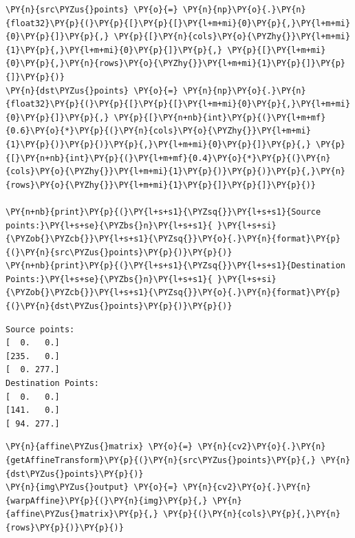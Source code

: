 \begin{tcolorbox}[breakable, size=fbox, boxrule=1pt, pad at break*=1mm,colback=cellbackground, colframe=cellborder]
	\begin{Verbatim}[commandchars=\\\{\}]
\PY{n}{src\PYZus{}points} \PY{o}{=} \PY{n}{np}\PY{o}{.}\PY{n}{float32}\PY{p}{(}\PY{p}{[}\PY{p}{[}\PY{l+m+mi}{0}\PY{p}{,}\PY{l+m+mi}{0}\PY{p}{]}\PY{p}{,} \PY{p}{[}\PY{n}{cols}\PY{o}{\PYZhy{}}\PY{l+m+mi}{1}\PY{p}{,}\PY{l+m+mi}{0}\PY{p}{]}\PY{p}{,} \PY{p}{[}\PY{l+m+mi}{0}\PY{p}{,}\PY{n}{rows}\PY{o}{\PYZhy{}}\PY{l+m+mi}{1}\PY{p}{]}\PY{p}{]}\PY{p}{)}
\PY{n}{dst\PYZus{}points} \PY{o}{=} \PY{n}{np}\PY{o}{.}\PY{n}{float32}\PY{p}{(}\PY{p}{[}\PY{p}{[}\PY{l+m+mi}{0}\PY{p}{,}\PY{l+m+mi}{0}\PY{p}{]}\PY{p}{,} \PY{p}{[}\PY{n+nb}{int}\PY{p}{(}\PY{l+m+mf}{0.6}\PY{o}{*}\PY{p}{(}\PY{n}{cols}\PY{o}{\PYZhy{}}\PY{l+m+mi}{1}\PY{p}{)}\PY{p}{)}\PY{p}{,}\PY{l+m+mi}{0}\PY{p}{]}\PY{p}{,} \PY{p}{[}\PY{n+nb}{int}\PY{p}{(}\PY{l+m+mf}{0.4}\PY{o}{*}\PY{p}{(}\PY{n}{cols}\PY{o}{\PYZhy{}}\PY{l+m+mi}{1}\PY{p}{)}\PY{p}{)}\PY{p}{,}\PY{n}{rows}\PY{o}{\PYZhy{}}\PY{l+m+mi}{1}\PY{p}{]}\PY{p}{]}\PY{p}{)}
		
\PY{n+nb}{print}\PY{p}{(}\PY{l+s+s1}{\PYZsq{}}\PY{l+s+s1}{Source points:}\PY{l+s+se}{\PYZbs{}n}\PY{l+s+s1}{ }\PY{l+s+si}{\PYZob{}\PYZcb{}}\PY{l+s+s1}{\PYZsq{}}\PY{o}{.}\PY{n}{format}\PY{p}{(}\PY{n}{src\PYZus{}points}\PY{p}{)}\PY{p}{)}
\PY{n+nb}{print}\PY{p}{(}\PY{l+s+s1}{\PYZsq{}}\PY{l+s+s1}{Destination Points:}\PY{l+s+se}{\PYZbs{}n}\PY{l+s+s1}{ }\PY{l+s+si}{\PYZob{}\PYZcb{}}\PY{l+s+s1}{\PYZsq{}}\PY{o}{.}\PY{n}{format}\PY{p}{(}\PY{n}{dst\PYZus{}points}\PY{p}{)}\PY{p}{)}
	\end{Verbatim}
\end{tcolorbox}

\begin{Verbatim}[commandchars=\\\{\}]
Source points:
[  0.   0.]
[235.   0.]
[  0. 277.]
Destination Points:
[  0.   0.]
[141.   0.]
[ 94. 277.]
\end{Verbatim}

\begin{tcolorbox}[breakable, size=fbox, boxrule=1pt, pad at break*=1mm,colback=cellbackground, colframe=cellborder]
	\begin{Verbatim}[commandchars=\\\{\}]
\PY{n}{affine\PYZus{}matrix} \PY{o}{=} \PY{n}{cv2}\PY{o}{.}\PY{n}{getAffineTransform}\PY{p}{(}\PY{n}{src\PYZus{}points}\PY{p}{,} \PY{n}{dst\PYZus{}points}\PY{p}{)}
\PY{n}{img\PYZus{}output} \PY{o}{=} \PY{n}{cv2}\PY{o}{.}\PY{n}{warpAffine}\PY{p}{(}\PY{n}{img}\PY{p}{,} \PY{n}{affine\PYZus{}matrix}\PY{p}{,} \PY{p}{(}\PY{n}{cols}\PY{p}{,}\PY{n}{rows}\PY{p}{)}\PY{p}{)}
	\end{Verbatim}
\end{tcolorbox}

